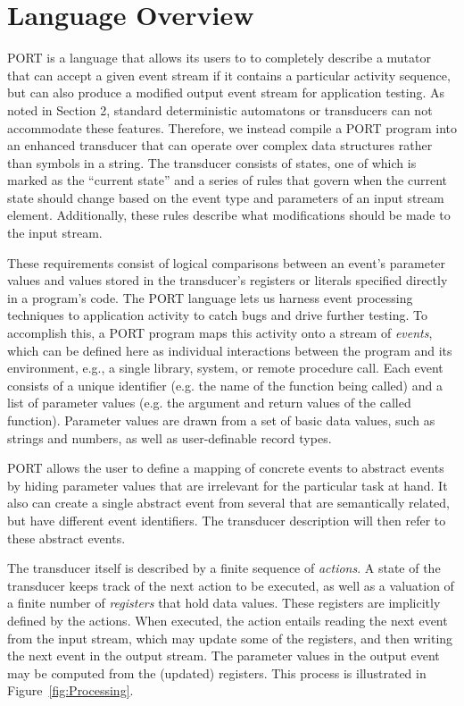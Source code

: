 \section{Language Overview}
\label{sec:Overview}

PORT is a language that allows its users to
to completely describe a mutator
that can
accept a given event stream if it contains a particular
activity sequence, but can also produce a modified
output event stream
for application testing.
As noted in Section 2, standard
deterministic automatons or transducers can not accommodate these features.
Therefore, we instead compile a PORT program into
an  enhanced transducer that can operate over complex data structures
rather than symbols in a string.
The transducer consists of states, one of which is marked as the ``current state'' and
a series of rules that govern when the current state should change based on the event type
and parameters of an input stream element.
Additionally, these rules describe what modifications should be made to the input stream.


These requirements consist of logical comparisons between an event's parameter values
and values stored in the transducer's registers or literals specified directly in a program's code.
The PORT language lets us harness event processing techniques to application activity to catch bugs and drive further testing. 
To accomplish this, a PORT program maps this activity onto a
stream of \emph{events}, which can be defined here as individual interactions between the program and its environment, e.g.,
a single library, system, or remote procedure call.
Each event consists of a unique identifier (e.g. the name of the function being called) and a list of parameter values (e.g. the argument and return values of the called function).
Parameter values are drawn from a set of basic data values, such as strings and numbers, as well as user-definable record types.

PORT allows the user to define a mapping of concrete events to abstract events by hiding parameter values that are irrelevant for the particular task at hand.  It also can create a single abstract event from several that are semantically related, but have different event identifiers. The transducer description will then refer to these abstract events.

The transducer itself is described by a finite sequence of \emph{actions}. A state of the transducer keeps track of the next action to be executed, as well as a valuation of a finite number of \emph{registers} that hold data values.
These registers are implicitly defined by the actions. When executed, the action entails reading the next event from the input stream, which may update some of the registers, and then writing the next event in the output stream.
The parameter values in the output event may be computed from the (updated) registers. This process is illustrated in Figure~\ref{fig:Processing}.


